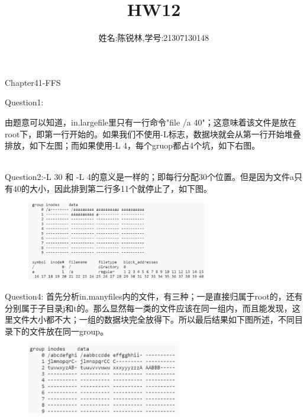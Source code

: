 \documentclass[12pt]{article}
\title{HW12}
\author{姓名:陈锐林,学号:21307130148}
\begin{document}
\maketitle
\begin{Large}
    \noindent Chapter41-FFS\\
\end{Large}
Question1:\par
由题意可以知道，in.largefile里只有一行命令"file /a 40"；这意味着该文件是放在root下，即第一行开始的。如果我们不使用-L标志，数据块就会从第一行开始堆叠排放，如下左图；而如果使用-L 4，每个gruop都占4个坑，如下右图。
\begin{figure}[!h]
    \centering
    \hfill
\end{figure}\\
Question2:-L 30 和 -L 4的意义是一样的；即每行分配30个位置。但是因为文件a只有40的大小，因此排到第二行多11个就停止了，如下图。
\begin{figure}[H]
    \centering
    \includegraphics*[width=0.7\textwidth]{hw12-3.jpg}
\end{figure}
\noindent Question4: 首先分析in.manyfiles内的文件，有三种；一是直接归属于root的，还有分别属于子目录j和t的。那么显然每一类的文件应该在同一组内，而且能发现，这里文件大小都不大；一组的数据块完全放得下。所以最后结果如下图所述，不同目录下的文件放在同一group。
\newpage
\begin{figure}[H]
    \centering
    \includegraphics*[width=0.6\textwidth]{hw12-4.jpg}
\end{figure}
\end{document}
